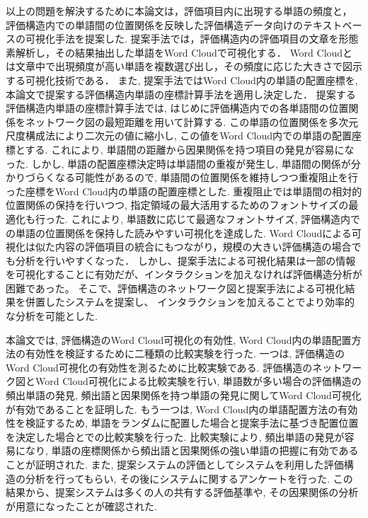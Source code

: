 \documentclass[syuuron]{kuee}
\begin{document}
	以上の問題を解決するために本論文は，評価項目内に出現する単語の頻度と，
	評価構造内での単語間の位置関係を反映した評価構造データ向けのテキストベースの可視化手法を提案した. 
	提案手法では，評価構造内の評価項目の文章を形態素解析し，その結果抽出した単語をWord Cloudで可視化する．
	Word Cloudとは文章中で出現頻度が高い単語を複数選び出し，その頻度に応じた大きさで図示する可視化技術である．
	また, 提案手法ではWord Cloud内の単語の配置座標を, 本論文で提案する評価構造内単語の座標計算手法を適用し決定した．
	提案する評価構造内単語の座標計算手法では, はじめに評価構造内での各単語間の位置関係をネットワーク図の最短距離を用いて計算する. 
	この単語の位置関係を多次元尺度構成法により二次元の値に縮小し, この値をWord Cloud内での単語の配置座標とする. 
	これにより, 単語間の距離から因果関係を持つ項目の発見が容易になった. 
	しかし, 単語の配置座標決定時は単語間の重複が発生し, 単語間の関係が分かりづらくなる可能性があるので, 
	単語間の位置関係を維持しつつ重複阻止を行った座標をWord Cloud内の単語の配置座標とした. 
	重複阻止では単語間の相対的位置関係の保持を行いつつ, 指定領域の最大活用するためのフォントサイズの最適化も行った. 
	これにより, 単語数に応じて最適なフォントサイズ, 評価構造内での単語の位置関係を保持した読みやすい可視化を達成した. 
	Word Cloudによる可視化は似た内容の評価項目の統合にもつながり，規模の大きい評価構造の場合でも分析を行いやすくなった．
	しかし、提案手法による可視化結果は一部の情報を可視化することに有効だが、インタラクションを加えなければ評価構造分析が困難であった。
	そこで、評価構造のネットワーク図と提案手法による可視化結果を併置したシステムを提案し、
	インタラクションを加えることでより効率的な分析を可能とした. 

	本論文では, 評価構造のWord Cloud可視化の有効性, Word Cloud内の単語配置方法の有効性を検証するために二種類の比較実験を行った. 
	一つは, 評価構造のWord Cloud可視化の有効性を測るために比較実験である.  
	評価構造のネットワーク図とWord Cloud可視化による比較実験を行い, 
	単語数が多い場合の評価構造の頻出単語の発見, 頻出語と因果関係を持つ単語の発見に関してWord Cloud可視化が有効であることを証明した. 
	もう一つは, Word Cloud内の単語配置方法の有効性を検証するため, 
	単語をランダムに配置した場合と提案手法に基づき配置位置を決定した場合とでの比較実験を行った. 
	比較実験により, 頻出単語の発見が容易になり, 単語の座標関係から頻出語と因果関係の強い単語の把握に有効であることが証明された. 
	また, 提案システムの評価としてシステムを利用した評価構造の分析を行ってもらい, その後にシステムに関するアンケートを行った. 
	この結果から、提案システムは多くの人の共有する評価基準や, その因果関係の分析が用意になったことが確認された. 
\end{document}
